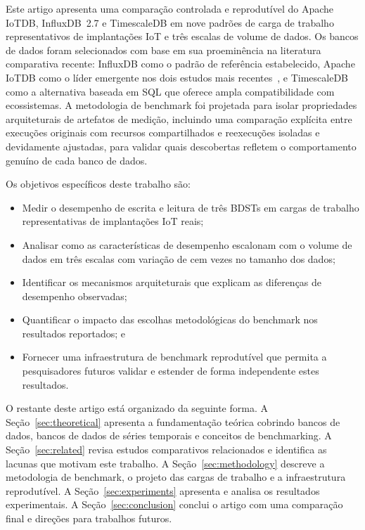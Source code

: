 Este artigo apresenta uma comparação controlada e reprodutível do Apache IoTDB, InfluxDB~2.7
e TimescaleDB em nove padrões de carga de trabalho representativos de implantações IoT e
três escalas de volume de dados. Os bancos de dados foram selecionados com base em sua
proeminência na literatura comparativa recente: InfluxDB como o padrão de referência
estabelecido, Apache IoTDB como o líder emergente nos dois estudos mais recentes~\citep{pereira2023mulletbench,wang2023iotdb},
e TimescaleDB como a alternativa baseada em SQL que oferece ampla compatibilidade com
ecossistemas. A metodologia de benchmark foi projetada para isolar propriedades arquiteturais
de artefatos de medição, incluindo uma comparação explícita entre execuções originais com
recursos compartilhados e reexecuções isoladas e devidamente ajustadas, para validar quais
descobertas refletem o comportamento genuíno de cada banco de dados.

Os objetivos específicos deste trabalho são:
\begin{itemize}
  \item Medir o desempenho de escrita e leitura de três BDSTs em cargas de trabalho
    representativas de implantações IoT reais;
  \item Analisar como as características de desempenho escalonam com o volume de dados
    em três escalas com variação de cem vezes no tamanho dos dados;
  \item Identificar os mecanismos arquiteturais que explicam as diferenças de desempenho
    observadas;
  \item Quantificar o impacto das escolhas metodológicas do benchmark nos resultados
    reportados; e
  \item Fornecer uma infraestrutura de benchmark reprodutível que permita a pesquisadores
    futuros validar e estender de forma independente estes resultados.
\end{itemize}

O restante deste artigo está organizado da seguinte forma.
A Seção~\ref{sec:theoretical} apresenta a fundamentação teórica cobrindo bancos de dados,
bancos de dados de séries temporais e conceitos de benchmarking.
A Seção~\ref{sec:related} revisa estudos comparativos relacionados e identifica as lacunas
que motivam este trabalho.
A Seção~\ref{sec:methodology} descreve a metodologia de benchmark, o projeto das cargas de
trabalho e a infraestrutura reprodutível.
A Seção~\ref{sec:experiments} apresenta e analisa os resultados experimentais.
A Seção~\ref{sec:conclusion} conclui o artigo com uma comparação final e direções para
trabalhos futuros.
